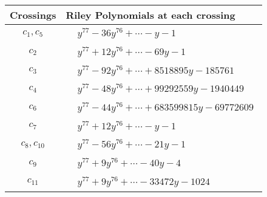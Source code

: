 \documentclass[1p]{elsarticle_modified}
\theoremstyle{definition}
\begin{document}
\begin{tabular}{m{50pt}|m{274pt}}
Crossings & \hspace{64pt}Riley Polynomials at each crossing \\
\hline $$\begin{aligned}c_{1},c_{5}\end{aligned}$$&$\begin{aligned}
&y^{77}-36 y^{76}+\cdots- y-1
\end{aligned}$\\
\hline $$\begin{aligned}c_{2}\end{aligned}$$&$\begin{aligned}
&y^{77}+12 y^{76}+\cdots-69 y-1
\end{aligned}$\\
\hline $$\begin{aligned}c_{3}\end{aligned}$$&$\begin{aligned}
&y^{77}-92 y^{76}+\cdots+8518895 y-185761
\end{aligned}$\\
\hline $$\begin{aligned}c_{4}\end{aligned}$$&$\begin{aligned}
&y^{77}-48 y^{76}+\cdots+99292559 y-1940449
\end{aligned}$\\
\hline $$\begin{aligned}c_{6}\end{aligned}$$&$\begin{aligned}
&y^{77}-44 y^{76}+\cdots+683599815 y-69772609
\end{aligned}$\\
\hline $$\begin{aligned}c_{7}\end{aligned}$$&$\begin{aligned}
&y^{77}+12 y^{76}+\cdots- y-1
\end{aligned}$\\
\hline $$\begin{aligned}c_{8},c_{10}\end{aligned}$$&$\begin{aligned}
&y^{77}-56 y^{76}+\cdots-21 y-1
\end{aligned}$\\
\hline $$\begin{aligned}c_{9}\end{aligned}$$&$\begin{aligned}
&y^{77}+9 y^{76}+\cdots-40 y-4
\end{aligned}$\\
\hline $$\begin{aligned}c_{11}\end{aligned}$$&$\begin{aligned}
&y^{77}+9 y^{76}+\cdots-33472 y-1024
\end{aligned}$\\
\hline
\end{tabular}\\~\\
\end{document}
